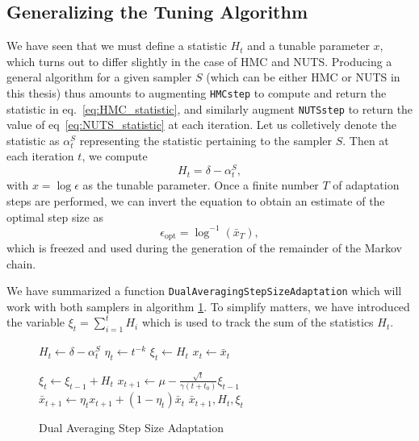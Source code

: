 \subsection{Generalizing the Tuning Algorithm}
We have seen that we must define a statistic $H_t$ and a tunable parameter $x$, which turns out to differ slightly in the case of HMC and NUTS. Producing a general algorithm for a given sampler $S$ (which can be either HMC or NUTS in this thesis) thus amounts to augmenting {\tt HMCstep} to compute and return the statistic in eq.~\eqref{eq:HMC_statistic}, and similarly augment {\tt NUTSstep} to return the value of eq~\eqref{eq:NUTS_statistic} at each iteration. Let us colletively denote the statistic as $\alpha_t^S$ representing the statistic pertaining to the sampler $S$. Then at each iteration $t$, we compute
\begin{equation}
    H_t = \delta - \alpha_t^S,
\end{equation} 
with $x = \log \epsilon$ as the tunable parameter. Once a finite number $T$ of adaptation steps are performed, we can invert the equation to obtain an estimate of the optimal step size as
\begin{equation}
    \epsilon_\text{opt} = \log^{-1}(\bar{x}_T),
\end{equation} 
which is freezed and used during the generation of the remainder of the Markov chain.

We have summarized a function {\tt DualAveragingStepSizeAdaptation} which will work with both samplers in algorithm \ref{algo:dual_step_size_adaptation}. To simplify matters, we have introduced the variable $\xi_t = \sum_{i = 1}^t H_i$ which is used to track the sum of the statistics $H_t$.

\begin{figure}[H]
	\begin{algorithm}[H]
	\caption{Dual Averaging Step Size Adaptation}\label{algo:dual_step_size_adaptation}
	\begin{algorithmic}
            \State $H_t \gets \delta - \alpha_t^S$
            \State $\eta_t \gets t^{-k}$
                \State $\xi_t \gets H_t$
                \State $x_t \gets \bar{x}_t$

            \Else
                \State $\xi_t \gets \xi_{t-1} + H_t$ 
            \EndIf
            \State $x_{t+1} \gets \mu - \frac{\sqrt{t}}{\gamma(t + t_0)} \xi_{t-1}$ 
            \State $\bar{x}_{t+1} \gets \eta_t x_{t+1} + (1 - \eta_t)\bar{x}_t$ 
            \State \Return $\bar{x}_{t+1}, H_t, \xi_t$
        \EndFunction
	\end{algorithmic}
	\end{algorithm}
\end{figure}
